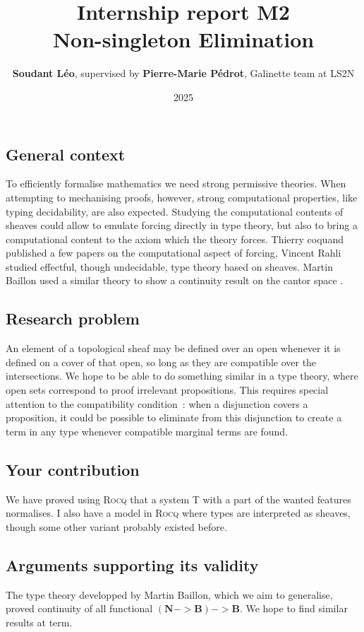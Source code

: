 \documentclass[11pt]{article}
\title{Internship report M2\\  Non-singleton Elimination\\}
\author{\textbf{Soudant L\'eo}, supervised by \textbf{Pierre-Marie P\'edrot}, Galinette team at LS2N}
\date{2025}
\newcommand{\0}{\mathbf{0}}
\newcommand{\1}{\mathbf{1}}
\newcommand{\nat}{\mathbf{N}}
\newcommand{\bool}{\mathbf{B}}
\begin{document}
\begin{titlepage}
    
\maketitle

\end{titlepage}


\subsection*{General context}
To efficiently formalise mathematics we need strong permissive theories.
When attempting to mechanising proofs, however, strong computational properties, like typing decidability, are also expected.
Studying the computational contents of sheaves could allow to emulate forcing directly in type theory, but also to bring a computational content to the axiom which the theory forces.
Thierry coquand published a few papers on the computational aspect of forcing, Vincent Rahli studied effectful, though undecidable, type theory based on sheaves.
Martin Baillon used a similar theory to show a continuity result on the cantor space \cite{baillon:tel-04617881}.
\subsection*{Research problem}
An element of a topological sheaf may be defined over an open whenever it is defined on a cover of that open, so long as they are compatible over the intersections.
We hope to be able to do something similar in a type theory, where open sets correspond to proof irrelevant propositions.
This requires special attention to the compatibility condition~: when a disjunction covers a proposition, it could be possible to eliminate from this disjunction to create a term in any type whenever compatible marginal terms are found.
\subsection*{Your contribution}
We have proved using \textsc{Rocq} that a system T with a part of the wanted features normalises. I also have a model in \textsc{Rocq} where types are interpreted as sheaves, though some other variant probably existed before.
\subsection*{Arguments supporting its validity}
The type theory developped by Martin Baillon, which we aim to generalise, proved continuity of all functional $(\nat -> \bool) -> \bool$.
We hope to find similar results at term.
\end{document}
